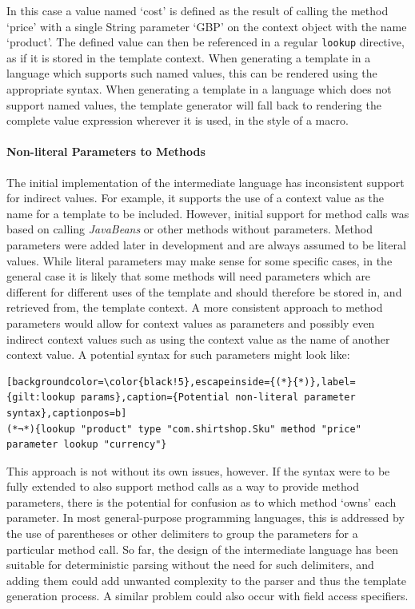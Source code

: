 In this case a value named `cost' is defined as the result of calling the method `price' with a single String parameter `GBP' on the context object with the name `product'. The defined value can then be referenced in a regular \verb!lookup! directive, as if it is stored in the template context. When generating a template in a language which supports such named values, this can be rendered using the appropriate syntax. When generating a template in a language which does not support named values, the template generator will fall back to rendering the complete value expression wherever it is used, in the style of a macro.

\paragraph{Non-literal Parameters to Methods}

The initial implementation of the intermediate language has inconsistent support for indirect values. For example, it supports the use of a context value as the name for a template to be included. However, initial support for method calls was based on calling \emph{JavaBeans} or other methods without parameters. Method parameters were added later in development and are always assumed to be literal values. While literal parameters may make sense for some specific cases, in the general case it is likely that some methods will need parameters which are different for different uses of the template and should therefore be stored in, and retrieved from, the template context. A more consistent approach to method parameters would allow for context values as parameters and possibly even indirect context values such as using the context value as the name of another context value. A potential syntax for such parameters might look like:

\begin{lstlisting}[backgroundcolor=\color{black!5},escapeinside={(*}{*)},label={gilt:lookup params},caption={Potential non-literal parameter syntax},captionpos=b]
(*¬*){lookup "product" type "com.shirtshop.Sku" method "price" parameter lookup "currency"}
\end{lstlisting}

This approach is not without its own issues, however. If the syntax were to be fully extended to also support method calls as a way to provide method parameters, there is the potential for confusion as to which method `owns' each parameter. In most general-purpose programming languages, this is addressed by the use of parentheses or other delimiters to group the parameters for a particular method call. So far, the design of the intermediate language has been suitable for deterministic parsing without the need for such delimiters, and adding them could add unwanted complexity to the parser and thus the template generation process. A similar problem could also occur with field access specifiers.

